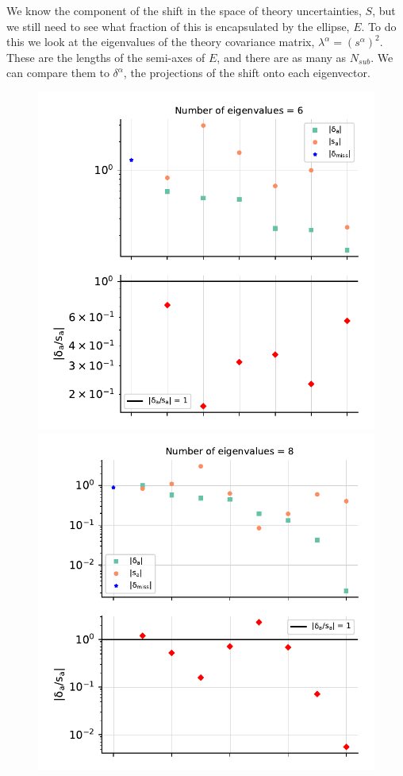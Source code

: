 We know the component of the shift in the space of theory uncertainties, $S$, but we still need to see what fraction of this is encapsulated by the ellipse, $E$. To do this we look at the eigenvalues of the theory covariance matrix, $\lambda^\alpha = (s^\alpha)^2$. These are the lengths of the semi-axes of $E$, and there are as many as $N_{sub}$. We can compare them to $\delta^\alpha$, the projections of the shift onto each eigenvector. 
\begin{figure}[H]
  \begin{center}
    \includegraphics[scale=0.55]{mhous/plots/projector_eigenvalue_ratio_3pt_global.pdf}
    \includegraphics[scale=0.55]{mhous/plots/projector_eigenvalue_ratio_5pt_global.pdf}

\end{center}
\end{figure}
